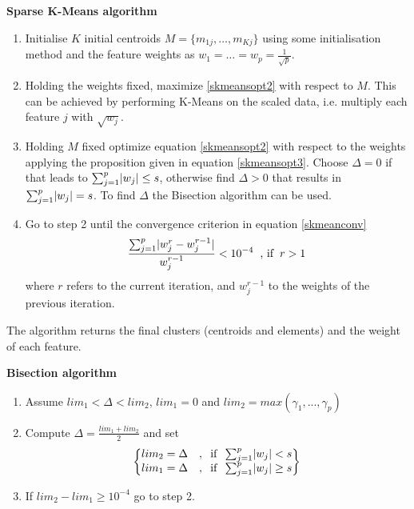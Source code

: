 \documentclass[12pt]{article}
\renewcommand\cite{\citep}  %
\DeclarePairedDelimiter{\abs}{\lvert}{\rvert} %
\begin{document}
\begin{center}
	\begin{tcolorbox}[breakable,colback=white!100!white,colframe=black!100!black]
		\noindent\textbf{Sparse K-Means algorithm \cite{witten2010framework}}
		\begin{enumerate}
			\item Initialise $K$ initial centroids $M = \{m_{1j}, \dots, m_{Kj}\}$ using some initialisation method and the feature weights as $w_{1} = \dots = w_{p} = \frac{1}{\sqrt{p}}$.
			\item Holding the weights fixed, maximize \ref{skmeansopt2} with respect to $M$. This can be achieved by performing K-Means on the scaled data, i.e. multiply each feature $j$ with $\sqrt{w_j}$.	
			\item Holding $M$ fixed optimize equation \ref{skmeansopt2} with respect to the weights applying the proposition given in equation \ref{skmeansopt3}. Choose $\Delta = 0$ if that leads to $\sum_{j=1}^{p} \abs{w_{j}} \leq s$, otherwise find $\Delta > 0$ that results in $\sum_{j=1}^{p} \abs{w_{j}} = s$. To find $\Delta$ the Bisection algorithm can be used.
			\item Go to step 2 until the convergence criterion in equation \ref{skmeanconv}
			\begin{align}\label{skmeanconv}
			\frac{ \sum_{j=1}^{p}\abs{w_{j}^{r}-w_{j}^{r-1}} }{ w_{j}^{r-1} } < 10^{-4} \hphantom{x}\text{, if}\hphantom{x}r > 1
			\end{align}	
			where $r$ refers to the current iteration, and $w_{j}^{r-1}$ to the weights of the previous iteration.
		\end{enumerate}	
		The algorithm returns the final clusters (centroids and elements) and the weight of each feature.		
		
		\vspace{1.0cm}
		
		\noindent\textbf{Bisection algorithm}
		\begin{enumerate}
			\item Assume $lim_1 < \Delta < lim_2$, $lim_1 = 0$ and $lim_2 = max(\gamma_1,...,\gamma_p)$
			
			\item Compute $\Delta = \frac{lim_1+lim_2}{2}$ and set
			\begin{align}\nonumber
			\begin{Bmatrix}
			lim_2 = \Delta
			&,\hphantom{x  } \text{if} \hphantom{x } \sum_{j=1}^{p} \abs{w_{j}} < s \\
			lim_1 = \Delta
			&,\hphantom{x  } \text{if} \hphantom{x } \sum_{j=1}^{p} \abs{w_{j}} \geq s
			\end{Bmatrix}
			\end{align}	
			
			\item If $lim_2-lim_1 \geq 10^{-4}$ go to step 2.
		\end{enumerate}
	\end{tcolorbox}
\end{center}
\end{document}
